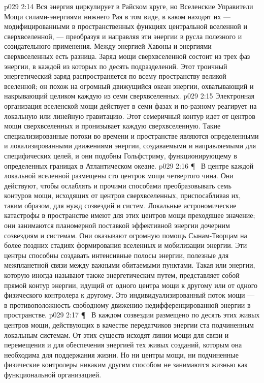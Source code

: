 \vs p029 2:14 Вся энергия циркулирует в Райском круге, но Вселенские Управители Мощи  силами\hyp{}энергиями нижнего Рая в том виде, в каком находят их --- модифицированными в пространственных функциях центральной вселенной и сверхвселенной, --- преобразуя и направляя эти энергии в русла полезного и созидательного применения. Между энергией Хавоны и энергиями сверхвселенных есть разница. Заряд мощи сверхвселенной состоит из трех фаз энергии, в каждой из которых по десять подразделений. Этот троичный энергетический заряд распространяется по всему пространству великой вселенной; он похож на огромный движущийся океан энергии, охватывающий и накрывающий целиком каждую из семи сверхвселенных.
\vs p029 2:15 Электронная организация вселенской мощи действует в семи фазах и по\hyp{}разному реагирует на локальную или линейную гравитацию. Этот семеричный контур идет от центров мощи сверхвселенных и пронизывает каждую сверхвселенную. Такие специализированные потоки во времени и пространстве являются определенными и локализированными движениями энергии, создаваемыми и направляемыми для специфических целей, и они подобны Гольфстриму, функционирующему в определенных границах в Атлантическом океане.
\vs p029 2:16 \P\ \bibnobreakspace {} В центре каждой локальной вселенной размещены сто центров мощи четвертого чина. Они действуют, чтобы ослаблять и прочими способами преобразовывать семь контуров мощи, исходящих от центров сверхвселенных, приспосабливая их, таким образом, для нужд созвездий и систем. Локальные астрономические катастрофы в пространстве имеют для этих центров мощи преходящее значение; они занимаются планомерной поставкой эффективной энергии дочерним созвездиям и системам. Они оказывают огромную помощь Сынам\hyp{}Творцам на более поздних стадиях формирования вселенных и мобилизации энергии. Эти центры способны создавать интенсивные полосы энергии, полезные для межпланетной связи между важными обитаемыми пунктами. Такая  или  энергии, которую иногда называют также энергетическим путем, представляет собой прямой контур энергии, идущий от одного центра мощи к другому или от одного физического контролера к другому. Это индивидуализированный поток мощи --- в противоположность свободному движению недифференцированной энергии в пространстве.
\vs p029 2:17 \P\ \bibnobreakspace {} В каждом созвездии размещено по десять этих живых центров мощи, действующих в качестве передатчиков энергии ста подчиненным локальным системам. От этих существ исходят линии мощи для связи и перемещения и для обеспечения энергией тех живых созданий, которым она необходима для поддержания жизни. Но ни центры мощи, ни подчиненные физические контролеры никаким другим способом не занимаются жизнью как функциональной организацией.
